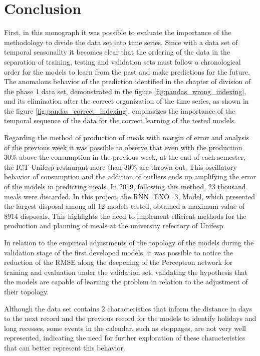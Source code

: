 \chapter{Conclusion} \label{cap:conclusoes}

    First, in this monograph it was possible to evaluate the importance of the methodology to divide the data set into time series. Since with a data set of temporal seasonality it becomes clear that the ordering of the data in the separation of training, testing and validation sets must follow a chronological order for the models to learn from the past and make predictions for the future. The anomalous behavior of the prediction identified in the chapter of division of the phase 1 data set, demonstrated in the figure \ref{fig:pandas_wrong_indexing}, and its elimination after the correct organization of the time series, as shown in the figure \ref{fig:pandas_correct_indexing}, emphasizes the importance of the temporal sequence of the data for the correct learning of the tested models.
    
    Regarding the method of production of meals with margin of error and analysis of the previous week it was possible to observe that even with the production 30\% above the consumption in the previous week, at the end of each semester, the ICT-Unifesp restaurant more than 30\% are thrown out. This oscillatory behavior of consumption and the addition of outliers ends up amplifying the error of the models in predicting meals. In 2019, following this method, 23 thousand meals were discarded. In this project, the RNN\_EXO\_3, Model, which presented the largest disposal among all 12 models tested, obtained a maximum value of 8914 disposals. This highlights the need to implement efficient methods for the production and planning of meals at the university refectory of Unifesp.
    
    In relation to the empirical adjustments of the topology of the models during the validation stage of the first developed models, it was possible to notice the reduction of the RMSE along the deepening of the Perceptron network for training and evaluation under the validation set, validating the hypothesis that the models are capable of learning the problem in relation to the adjustment of their topology.

    Although the data set contains 2 characteristics that inform the distance in days to the next record and the previous record for the models to identify holidays and long recesses, some events in the calendar, such as stoppages, are not very well represented, indicating the need for further exploration of these characteristics that can better represent this behavior.

